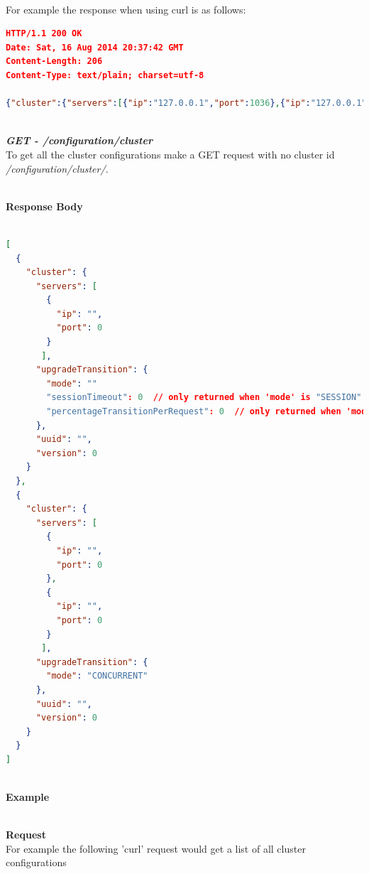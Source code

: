 \documentclass[a4paper,11pt,twoside]{article}
\begin{document}
\noindent \\
For example the response when using curl is as follows:

\begin{lstlisting}[language=json,firstnumber=1]
HTTP/1.1 200 OK
Date: Sat, 16 Aug 2014 20:37:42 GMT
Content-Length: 206
Content-Type: text/plain; charset=utf-8

{"cluster":{"servers":[{"ip":"127.0.0.1","port":1036},{"ip":"127.0.0.1","port":1038}],"upgradeTransition":{"mode":"SESSION","sessionTimeout":60},"uuid":"016ca2cd-2585-11e4-ab5c-600308a8245e","version":1.1}}
\end{lstlisting}

\noindent \\
\textit{\textbf{GET - /configuration/cluster}}\\
\noindent 
To get all the cluster configurations make a GET request with no cluster id \textit{/configuration/cluster/}.

\noindent \\
\textbf{Response Body}\\

\begin{lstlisting}[language=json,firstnumber=1]

[
  {
    "cluster": {
      "servers": [
        {
          "ip": "",
          "port": 0
        }
       ],
      "upgradeTransition": {
        "mode": ""
        "sessionTimeout": 0  // only returned when 'mode' is "SESSION" 
        "percentageTransitionPerRequest": 0  // only returned when 'mode' is "GRADUAL"
      },
      "uuid": "",
      "version": 0
    }
  },
  {
    "cluster": {
      "servers": [
        {
          "ip": "",
          "port": 0
        },
        {
          "ip": "",
          "port": 0
        }
       ],
      "upgradeTransition": {
        "mode": "CONCURRENT"
      },
      "uuid": "",
      "version": 0
    }
  }
]
\end{lstlisting}

\noindent \\
\textbf{Example}

\noindent \\
\textbf{Request}\\

\noindent 
For example the following 'curl' request would get a list of all cluster configurations\\
\end{document}
